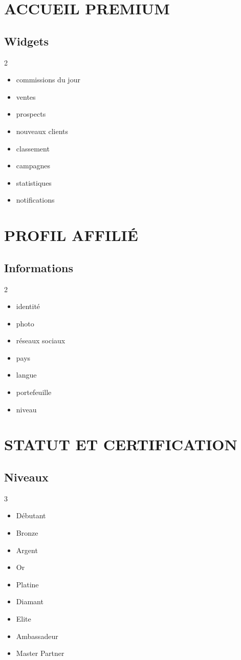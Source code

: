 \documentclass[12pt,a4paper,oneside]{book}
\begin{document}
\chapter{ACCUEIL PREMIUM}

\section{Widgets}
\begin{multicols}{2}
\begin{itemize}
\item commissions du jour
\item ventes
\item prospects
\item nouveaux clients
\item classement
\item campagnes
\item statistiques
\item notifications
\end{itemize}
\end{multicols}

\chapter{PROFIL AFFILIÉ}

\section{Informations}
\begin{multicols}{2}
\begin{itemize}
\item identité
\item photo
\item réseaux sociaux
\item pays
\item langue
\item portefeuille
\item niveau
\end{itemize}
\end{multicols}

\chapter{STATUT ET CERTIFICATION}

\section{Niveaux}
\begin{multicols}{3}
\begin{itemize}
\item Débutant
\item Bronze
\item Argent
\item Or
\item Platine
\item Diamant
\item Elite
\item Ambassadeur
\item Master Partner
\end{itemize}
\end{multicols}
\end{document}
